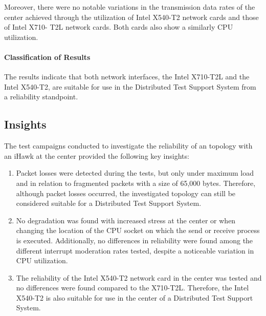 Moreover, there were no notable variations in the transmission data rates of the center achieved through the utilization of Intel X540-T2 network cards and those of Intel X710- T2L network cards. Both cards also show a similarly CPU utilization.

\paragraph{Classification of Results}
The results indicate that both network interfaces, the Intel X710-T2L and the Intel X540-T2, are suitable for use in the Distributed Test Support System from a reliability standpoint. 

\subsection{Insights} \label{insight:relHawk}
The test campaigns conducted to investigate the reliability of an topology with an iHawk at the center provided the following key insights:

\begin{enumerate}[label=(\roman*),resume]
    \item Packet losses were detected during the tests, but only under maximum load and in relation to fragmented packets with a size of 65,000 bytes. Therefore, although packet losses occurred, the investigated topology can still be considered suitable for a Distributed Test Support System. \label{insight:relHawk:1}
    \item No degradation was found with increased stress at the center or when changing the location of the CPU socket on which the send or receive process is executed. Additionally, no differences in reliability were found among the different interrupt moderation rates tested, despite a noticeable variation in CPU utilization. \label{insight:relHawk:2}
    \item The reliability of the Intel X540-T2 network card in the center was tested and no differences were found compared to the X710-T2L. Therefore, the Intel X540-T2 is also suitable for use in the center of a Distributed Test Support System. \label{insight:relHawk:3}
\end{enumerate}














